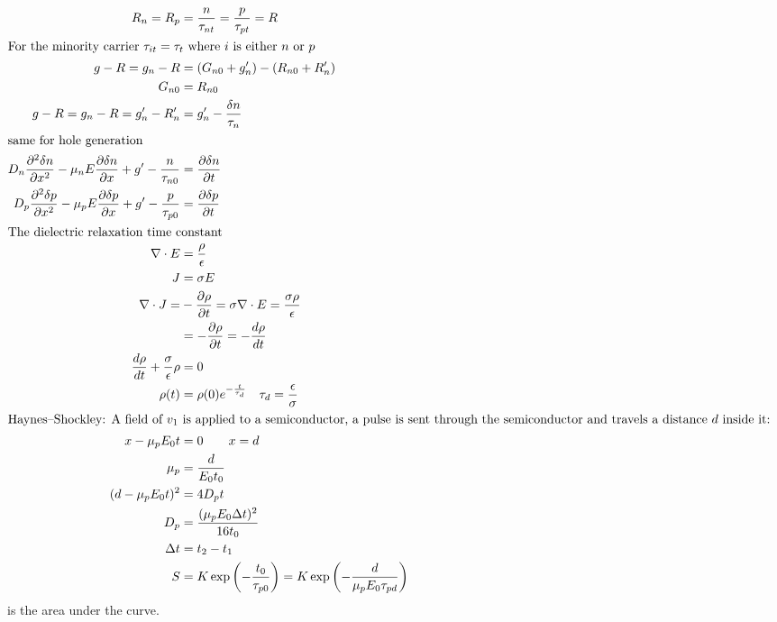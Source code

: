 \begin{columns}
{\begin{align*}
        R_n=R_p&=\frac{n}{\tau_{nt}}=\frac{p}{\tau_{pt}}=R\\
        \intertext{For the minority carrier $\tau_{it}=\tau_t$ where $i$ is either $n$ or $p$}
        g-R=g_n-R&=\left( G_{n0}+g'_n \right)-(R_{n0}+R_n')\\
        G_{n0}&=R_{n0}\\
        g-R=g_n-R=g'_n -R_n'&=g_{n}'-\frac{\delta n}{\tau_n}\\
        \intertext{same for hole generation}
        D_n \frac{\partial^2 \delta n}{\partial x^2}- \mu_n  E \frac{\partial \delta n}{\partial x} + g'-\frac{n}{\tau_{n0}}&=\frac{\partial \delta n}{\partial t}\\
        D_p \frac{\partial^2 \delta p}{\partial x^2}- \mu_p  E \frac{\partial \delta p}{\partial x} + g'-\frac{p}{\tau_{p0}}&=\frac{\partial \delta p}{\partial t}\\
        \intertext{The dielectric relaxation time constant}
        \nabla \cdot E&=\frac{\rho}{\epsilon}\\
        J&=\sigma E\\
        \nabla \cdot J=&-\frac{\partial \rho}{\partial t}=\sigma\nabla\cdot E=\frac{\sigma\rho}{\epsilon}\\
        &=-\frac{\partial \rho}{\partial t}=-\frac{d\rho}{dt}\\
        \frac{d\rho}{dt}+\frac{\sigma}{\epsilon}\rho&=0\\
        \rho(t)&=\rho(0)e^{-\frac{t}{\tau_d}}\quad \tau_d=\frac{\epsilon}{\sigma}\\
        \intertext{Haynes--Shockley: A field of $v_1$ is applied to a semiconductor, a pulse is sent through the semiconductor and travels a distance $d$ inside it:}
        x-\mu_pE_0t&=0\qquad x=d\\
        \mu_p&=\frac{d}{E_0t_0}\\
        (d-\mu_pE_0t)^2&=4D_pt\\
        D_p&=\frac{(\mu_pE_0\Delta t)^2}{16t_0}\\
        \Delta t&=t_2-t_1\\
        S&=K\exp\left( -\frac{t_0}{\tau_{p0}} \right)=K\exp\left( -\frac{d}{\mu_pE_0\tau_{pd}} \right)
\end{align*}
is the area under the curve.}
\end{columns}

